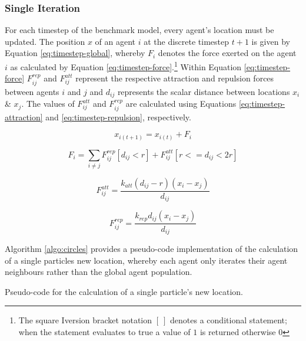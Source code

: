     \subsubsection{Single Iteration}
      For each timestep of the benchmark model, every agent's location must be updated. The position $x$ of an agent $i$ at the discrete timestep $t+1$ is given by Equation \ref{eq:timestep-global}, whereby $F_{i}$ denotes the force exerted on the agent $i$ as calculated by Equation \ref{eq:timestep-force}.\footnote{The square Iversion bracket notation $[\:]$ denotes a conditional statement; when the statement evaluates to true a value of $1$ is returned otherwise $0$} Within Equation \ref{eq:timestep-force} $F_{ij}^{rep}$ and $F_{ij}^{att}$ represent the respective attraction and repulsion forces between agents $i$ and $j$ and $d_{ij}$ represents the scalar distance between locations $x_{i}$ \& $x_{j}$. The values of $F_{ij}^{att}$ and $F_{ij}^{rep}$ are calculated using Equations \ref{eq:timestep-attraction} and \ref{eq:timestep-repulsion}, respectively.
      
      \begin{equation}\label{eq:timestep-global}
        x_{i(t+1)} = x_{i(t)} + F_{i}
      \end{equation}
      
      \begin{equation}\label{eq:timestep-force}
        F_{i} = \sum\limits_{i \neq j} F_{ij}^{rep}[d_{ij} < r] + F_{ij}^{att}[r <= d_{ij} < 2r]
      \end{equation}
      
      \begin{equation}\label{eq:timestep-attraction}
        F_{ij}^{att} = \frac{k_{att}(d_{ij}-r)(x_{i} - x_{j})} {d_{ij}}
      \end{equation}  
      
      \begin{equation}\label{eq:timestep-repulsion}
        F_{ij}^{rep} = \frac{k_{rep}d_{ij}(x_{i} - x_{j})} {d_{ij}}
      \end{equation}
      
      Algorithm \ref{algo:circles} provides a pseudo-code implementation of the calculation of a single particles new location, whereby each agent only iterates their agent neighbours rather than the global agent population.
      
\begin{algorithm}

\caption{\label{algo:circles}Pseudo-code for the calculation of a single particle's new location.}
\end{algorithm}

